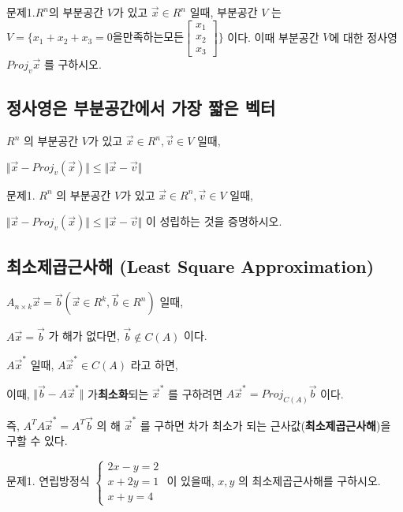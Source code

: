 \newpage
문제1.$R^n$의 부분공간 $V$가 있고 $\vec{x} \in R^n$ 일때, 부분공간 $V$ 는 $V = \{ x_1 + x_2 + x_3 = 0  을 만족하는 모든 \begin{bmatrix} x_1 \\ x_2 \\ x_3 \end{bmatrix} \}$ 이다. 이때 부분공간 $V$에 대한 정사영 $Proj_v\vec{x}$ 를 구하시오.

\newpage
\subsection{정사영은 부분공간에서 가장 짧은 벡터}
\begin{theorem}
$R^n$ 의 부분공간 $V$가 있고 $\vec{x} \in R^n, \vec{v} \in V$ 일때,

$\Vert \vec{x} - Proj_v(\vec{x}) \Vert \leq \Vert \vec{x} - \vec{v} \Vert$
\end{theorem}



\newpage
문제1. $R^n$ 의 부분공간 $V$가 있고 $\vec{x} \in R^n, \vec{v} \in V$ 일때,

$\Vert \vec{x} - Proj_v(\vec{x}) \Vert \leq \Vert \vec{x} - \vec{v} \Vert$ 이 성립하는 것을 증명하시오.

\newpage
\subsection{최소제곱근사해 (Least Square Approximation)}
\begin{theorem}
$A_{n \times k}\vec{x} = \vec{b} (\vec{x} \in R^k, \vec{b} \in R^n)$ 일때,

$A\vec{x} = \vec{b}$ 가 해가 없다면, $\vec{b} \notin C(A)$ 이다.

$A\vec{x}^{\ast}$  일때, $A\vec{x}^{\ast} \in C(A)$ 라고 하면,

이때, $\Vert \vec{b} - A\vec{x}^{\ast} \Vert$ 가\textbf{최소화}되는 $\vec{x}^{\ast}$ 를 구하려면 $A\vec{x}^{\ast} = Proj_{C(A)}\vec{b}$ 이다.

즉, $A^{T}A\vec{x}^{\ast} = A^{T}\vec{b}$ 의 해 $\vec{x}^{\ast}$ 를 구하면 차가 최소가 되는 근사값(\textbf{최소제곱근사해})을 구할 수 있다.
\end{theorem}



\newpage
문제1. 연립방정식 $\begin{cases} 2x - y = 2 \\ x + 2y = 1 \\ x + y = 4 \end{cases}$ 이 있을때, $x, y$ 의 최소제곱근사해를 구하시오.

